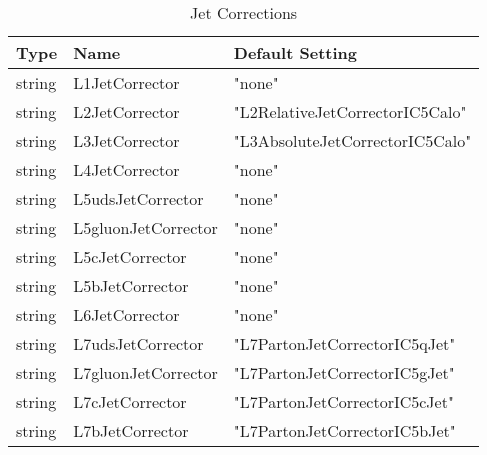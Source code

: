 \documentclass{cmspaper}
\begin{document}
\begin{table}[h]
\caption{Jet Corrections}
\begin{center}
\begin{tabular}{l|l|l}
\textbf{Type} & \textbf{Name} & \textbf{Default Setting}       \\\hline
string &L1JetCorrector       & "none"                          \\\hline 
string & L2JetCorrector      & "L2RelativeJetCorrectorIC5Calo" \\\hline
string & L3JetCorrector      & "L3AbsoluteJetCorrectorIC5Calo" \\\hline
string & L4JetCorrector      & "none"                          \\\hline
string & L5udsJetCorrector   & "none"                          \\\hline
string & L5gluonJetCorrector & "none"                          \\\hline
string & L5cJetCorrector     & "none"                          \\\hline
string & L5bJetCorrector     & "none"                          \\\hline
string & L6JetCorrector      & "none"                          \\\hline
string & L7udsJetCorrector   & "L7PartonJetCorrectorIC5qJet"   \\\hline
string & L7gluonJetCorrector & "L7PartonJetCorrectorIC5gJet"   \\\hline
string & L7cJetCorrector     & "L7PartonJetCorrectorIC5cJet"   \\\hline
string & L7bJetCorrector     & "L7PartonJetCorrectorIC5bJet" 
\end{tabular}
\end{center}
\label{tab:JetCorrections}
\end{table}
\end{document}
